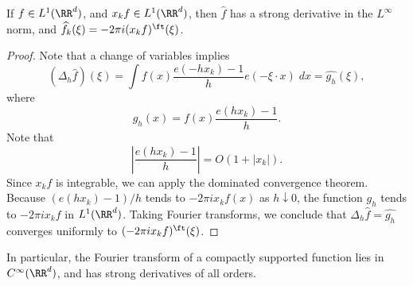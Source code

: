 \begin{theorem}
	If $f \in L^1(\RR^d)$, and $x_k f \in L^1(\RR^d)$, then $\widehat{f}$ has a strong derivative in the $L^\infty$ norm, and $\widehat{f}_k(\xi) = - 2 \pi i (x_k f)^\ft(\xi)$.
\end{theorem}
\begin{proof}
	Note that a change of variables implies
	\[ (\Delta_h \widehat{f})(\xi) = \int f(x) \frac{e(-h x_k) - 1}{h} e(- \xi \cdot x)\; dx = \widehat{g_h}(\xi), \]
	where
	\[ g_h(x) = f(x) \frac{e(h x_k) - 1}{h}. \]
	Note that
	\[ \left| \frac{e(h x_k) - 1}{h} \right| = O(1 + |x_k|). \]
	Since $x_k f$ is integrable, we can apply the dominated convergence theorem. Because $(e(h x_k) - 1)/h$ tends to $-2 \pi i x_k f(x)$ as $h \downarrow 0$, the function $g_h$ tends to $-2\pi i x_k f$ in $L^1(\RR^d)$. Taking Fourier transforms, we conclude that $\Delta_h \widehat{f} = \widehat{g_h}$ converges uniformly to $(-2 \pi i x_k f)^\ft(\xi)$.
\end{proof}

\begin{remark}
	In particular, the Fourier transform of a compactly supported function lies in $C^\infty(\RR^d)$, and has strong derivatives of all orders.
\end{remark}


